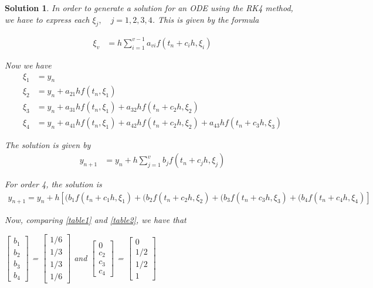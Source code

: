 \documentclass[12pt,a4paper]{article}
\newtheorem{solution}[theorem]{Solution}
\begin{document}
\begin{solution}
\noindent
In order to generate a solution for an ODE using the RK4 method, we have to express each $\xi_j, \quad j=1,2,3,4$. This is given by the formula 

\begin{align*}
\xi_v &= h \sum_{i=1}^{v-1}a_{vi}f(t_n + c_ih , \xi_i ) 
\end{align*}

\noindent
Now we have 
\begin{align}\label{xi1}\tag{1.3}
\xi_1 &= y_n \\ \label{xi2}\tag{1.4}
\xi_2 &= y_n + a_{21}h f (t_n, \xi_1 ) \\ \label{xi3}\tag{1.5}
\xi_3 &= y_n + a_{31}h f (t_n, \xi_1 ) + a_{32}h f (t_n + c_2h, \xi_2 ) \\ \label{xi4}\tag{1.6}
\xi_4 &= y_n + a_{41}h f(t_n, \xi_1 ) + a_{42}h f (t_n + c_2h, \xi_2 ) + a_{43}h f(t_n + c_3h, \xi_3 )  
\end{align}

\noindent
The solution is given by
\begin{align*}
y_{n+1} &= y_n + h \sum_{j=1}^{v}b_jf(t_n + c_jh , \xi_j ) 
\end{align*}

\noindent
For order 4, the solution is
\begin{align*}
y_{n+1} = y_n + h [(b_1f(t_n + c_1h , \xi_1 ) + (b_2f(t_n + c_2h , \xi_2 )+ (b_3f(t_n + c_3h , \xi_3 )+ (b_4f(t_n + c_4h , \xi_4 )]
\end{align*}

Now, comparing \ref{table1} and \ref{table2}, we have that 
 
$
\begin{bmatrix}
b_1 \\
b_2 \\
b_3 \\
b_4
\end{bmatrix}
$ = 
$
\begin{bmatrix}
1/6 \\
1/3 \\
1/3 \\
1/6
\end{bmatrix}
$
\qquad and  \qquad 
$
\begin{bmatrix}
0 \\
c_2 \\
c_3 \\
c_4
\end{bmatrix}
$ =
$
\begin{bmatrix}
0 \\
1/2 \\
1/2\\
1
\end{bmatrix}
$


\end{solution}
\end{document}
